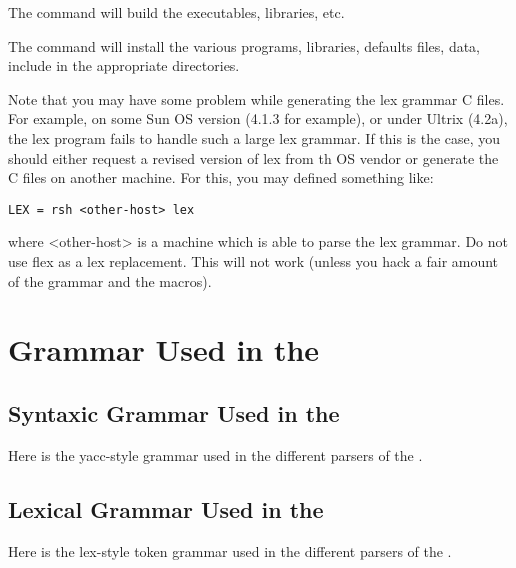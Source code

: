 The  command will build the executables, libraries, etc.

The  command will install the various programs,
libraries, defaults files, data, include in the appropriate directories.

Note that you may have some problem while generating the lex grammar C
files. For example, on some Sun OS version (4.1.3 for example), or under Ultrix
(4.2a), the lex program fails to handle such a large lex grammar. If this is
the case, you should either request a revised version of lex from th OS vendor
or generate the C files on another machine. For this, you may defined something
like:

\begin{verbatim}
LEX = rsh <other-host> lex
\end{verbatim}

where <other-host> is a machine which is able to parse the \COPRS{} lex grammar.
Do not use flex as a lex replacement. This will not work (unless you hack a
fair amount of the grammar and the macros).

\chapter{Grammar Used in the \COPRSDE{}}



\section{Syntaxic Grammar Used in the \COPRSDE{}}

Here is the yacc-style grammar used in the different parsers of the
\COPRSDE{}.


\section{Lexical Grammar Used in the \COPRSDE{}}

Here is the lex-style token grammar used in the different parsers of the
\COPRSDE{}.


